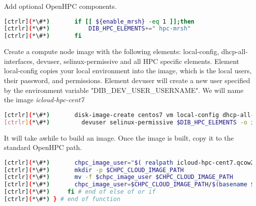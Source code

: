 

	Add optional OpenHPC components.


\begin{lstlisting}[language=bash,keywords={}]
[ctrlr](*\#*)       if [[ ${enable_mrsh} -eq 1 ]];then
[ctrlr](*\#*)           DIB_HPC_ELEMENTS+=" hpc-mrsh"
[ctrlr](*\#*)       fi
\end{lstlisting} 

	Create a compute node image with the following elements: local-config, dhcp-all-interfaces, devuser, selinux-permissive and all HPC specific elements. Element local-config copies your local environment into the image, which is the local users, their password, and permissions. Element devuser will create a new user specified by the environment variable "DIB\_DEV\_USER\_USERNAME". We will name the image {\em  icloud-hpc-cent7 }


\begin{lstlisting}[language=bash,keywords={}]
[ctrlr](*\#*)       disk-image-create centos7 vm local-config dhcp-all-interfaces \
[ctrlr](*\#*)         devuser selinux-permissive $DIB_HPC_ELEMENTS -o icloud-hpc-cent7
\end{lstlisting} 


	It will take awhile to build an image. Once the image is built, copy it to the standard OpenHPC path.


\begin{lstlisting}[language=bash,keywords={}]
[ctrlr](*\#*)       chpc_image_user="$( realpath icloud-hpc-cent7.qcow2)"
[ctrlr](*\#*)       mkdir -p $CHPC_CLOUD_IMAGE_PATH
[ctrlr](*\#*)       mv -f $chpc_image_user $CHPC_CLOUD_IMAGE_PATH
[ctrlr](*\#*)       chpc_image_user=$CHPC_CLOUD_IMAGE_PATH/$(basename $chpc_image_user)
[ctrlr](*\#*)     fi # end of else of or if
[ctrlr](*\#*) } # end of function
\end{lstlisting} 


